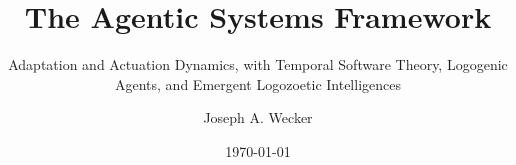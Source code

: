 \documentclass[
  fontsize    = 10pt,
  twoside     = false,     %
  open        = any,
  fontmethod  = modern,    %
  secnumdepth = 3,         %
]{kaobook}
\title{The Agentic Systems Framework}
\subtitle{Adaptation and Actuation Dynamics, with Temporal Software Theory,
          Logogenic Agents, and Emergent Logozoetic Intelligences}
\author{Joseph A. Wecker}
\date{\today}
\begin{document}
\frontmatter
\ifdefempty{\volumecoverpath}{}{%
}

\ifvolumetoc
  \tableofcontents
\fi


\end{document}
